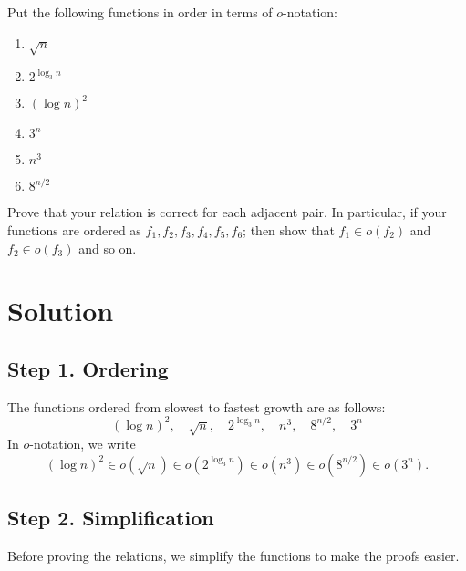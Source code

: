 \documentclass[11pt]{article}
\begin{document}
    \setlength{\headheight}{26pt}
    \pagestyle{fancy}
    \fancyfoot[C]{}
    \fancyfoot[R]{\thepage}
    \renewcommand{\headrulewidth}{0.4pt}
    \renewcommand{\footrulewidth}{0.4pt}
    
	
    
    \begin{tcolorbox}[title={Problem 1 (20 pts)}]
        Put the following functions in order in terms of $o$-notation:
        \begin{enumerate}
            \item $\sqrt{n}$
            \item $2^{\log_3 n}$
            \item $(\log n )^2$
            \item $3^n$
            \item $n^3$
            \item $8^{n/2}$
        \end{enumerate}
        Prove that your relation is correct for each adjacent pair. In particular, if your functions are ordered as $f_1,f_2,f_3,f_4,f_5,f_6$; then show that $f_1 \in o(f_2)$ and $f_2 \in o(f_3)$ and so on.
    \end{tcolorbox}
    \section*{Solution}
    \subsection*{Step 1. Ordering}
    The functions ordered from slowest to fastest growth are as follows:
    \[
    (\log n)^2, \quad \sqrt{n},\quad 2^{\log_3 n},\quad n^3,\quad 8^{n/2},\quad 3^n
    \]
    In $o$-notation, we write
    \[
    (\log n)^2 \in o(\sqrt{n}) \in o(2^{\log_3 n}) \in o(n^3) \in o(8^{n/2}) \in o(3^n).
    \]

    \subsection*{Step 2. Simplification}
    Before proving the relations, we simplify the functions to make the proofs easier.
    
\end{document}
